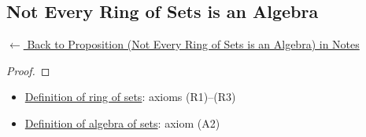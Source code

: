 
\subsection*{Not Every Ring of Sets is an Algebra}
\label{prf:ring-not-algebra}

\begin{remark*}[Return]
\hyperref[prop:ring-not-algebra]{$\leftarrow$ Back to Proposition (Not Every Ring of Sets is an Algebra) in Notes}
\end{remark*}

\begin{proof}
\end{proof}

\begin{remark*}

\end{remark*}

\begin{remark*}[Dependencies]
\begin{itemize}
  \item \hyperref[def:ring-of-sets]{Definition of ring of sets}: axioms (R1)--(R3)
  \item \hyperref[def:algebra-of-sets]{Definition of algebra of sets}: axiom (A2)
\end{itemize}

\end{remark*}
